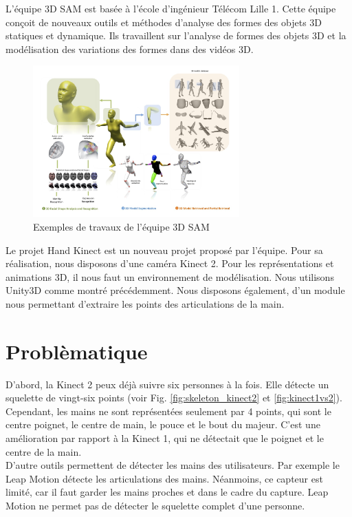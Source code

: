 L'équipe 3D SAM est basée à l'école d'ingénieur Télécom Lille 1. 
Cette équipe conçoit de nouveaux outils et méthodes d'analyse des 
formes des objets 3D statiques et dynamique. Ils travaillent sur 
l'analyse de formes des objets 3D et la modélisation des variations 
des formes dans des vidéos 3D.

\begin{figure}[H]
  \begin{center}
    \includegraphics[width=300px]{images/accueil-illus.jpg}
    \caption{Exemples de travaux de l'équipe 3D SAM}
  \end{center}
\end{figure}

Le projet \og Hand Kinect \fg est un nouveau projet proposé par 
l'équipe.
Pour sa réalisation, nous disposons d'une caméra Kinect 2. 
Pour les représentations et animations 3D, il nous faut un environnement 
de modélisation. Nous utilisons Unity3D comme montré précédemment. 
Nous disposons également, d'un module nous permettant d'extraire les 
points des articulations de la main.

\section{Problèmatique}
D'abord, la Kinect 2 peux déjà suivre six personnes à la fois. Elle 
détecte un squelette de vingt-six points (voir Fig. 
\ref{fig:skeleton_kinect2} et \ref{fig:kinect1vs2}). Cependant, les 
mains ne sont représentées seulement par 4 points, qui sont le centre 
poignet, le centre de main, le pouce et le bout du majeur. C'est une amélioration par rapport à la Kinect 1, qui ne détectait que le poignet 
et le centre de la main.\\

D'autre outils permettent de détecter les mains des utilisateurs. Par 
exemple le Leap Motion détecte les articulations des mains. Néanmoins,
ce capteur est limité, car il faut garder les mains proches et dans le 
cadre du capture. Leap Motion ne permet pas de détecter le squelette 
complet d'une personne.\\

